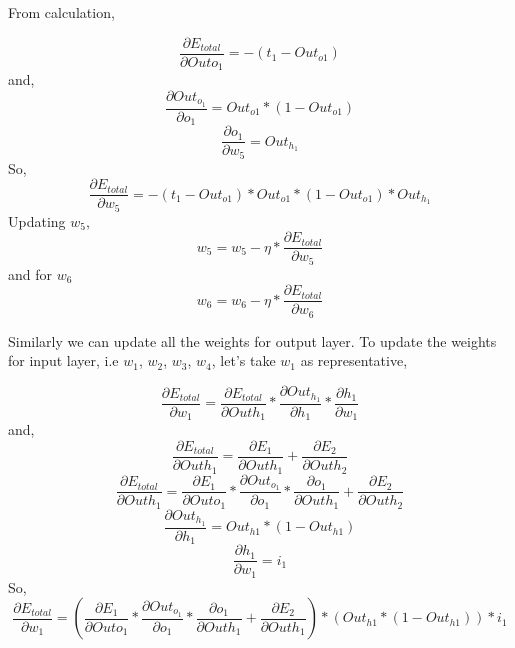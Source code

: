 \documentclass[a4paper,12pt]{report}
\begin{document}
From calculation,

\begin{equation}
\frac{\partial E_{total}}{\partial Out{o_1}}= - (t_1 - Out_{o1})
\end{equation}
and,
\begin{equation}
\frac{\partial Out_{o_1}}{\partial o_1}= Out_{o1} * (1 - Out_{o1})
\end{equation}
\begin{equation}
\frac{\partial o_1}{\partial w_5} = Out_{h_1}
\end{equation}
So,
\begin{equation}
\frac{\partial E_{total}}{\partial w_5} = - (t_1 - Out_{o1}) * Out_{o1} * (1 - Out_{o1}) * Out_{h_1}
\end{equation}
Updating $w_5$,
\begin{equation}
w_5 = w_5 - \eta * \frac{\partial E_{total}}{\partial w_5}
\end{equation}
and for $w_6$
\begin{equation}
w_6 = w_6 - \eta * \frac{\partial E_{total}}{\partial w_6}
\end{equation}

Similarly we can update all the weights for output layer. To update the weights for input layer, i.e $w_1$, $w_2$, $w_3$, $w_4$, let's take $w_1$ as representative,

\begin{equation}
\frac{\partial E_{total}}{\partial w_1} = \frac{\partial E_{total}}{\partial Out{h_1}} * \frac{\partial Out_{h_1}}{\partial h_1}  * \frac{\partial h_1}{\partial w_1} 
\end{equation}
and,
\begin{equation*}
\frac{\partial E_{total}}{\partial Out{h_1}} = \frac{\partial E_{1}}{\partial Out{h_1}} + \frac{\partial E_{2}}{\partial Out{h_2}}
\end{equation*}
\begin{equation}
\frac{\partial E_{total}}{\partial Out{h_1}} = \frac{\partial E_{1}}{\partial Out{o_1}} *  \frac{\partial Out_{o_1}}{\partial o_1} * \frac{\partial {o_1}}{\partial Out{h_1}}+  \frac{\partial E_{2}}{\partial Out{h_2}}
\end{equation}
\begin{equation}
\frac{\partial Out_{h_1}}{\partial h_1}= Out_{h1} * (1 - Out_{h1})
\end{equation}
\begin{equation}
\frac{\partial h_1}{\partial w_1} = i_1
\end{equation}
So,
\begin{equation}
\frac{\partial E_{total}}{\partial w_1}= ( \frac{\partial E_{1}}{\partial Out{o_1}} *  \frac{\partial Out_{o_1}}{\partial o_1} * \frac{\partial o_{1}}{\partial Out{h_1}}+  \frac{\partial E_{2}}{\partial Out{h_1}}) * (Out_{h1} * (1 - Out_{h1}))* i_1
\end{equation}
\end{document}
